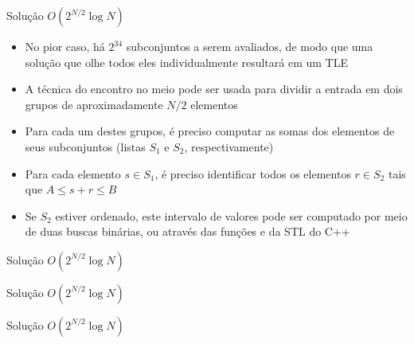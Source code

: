 \begin{frame}[fragile]{Solução $O(2^{N/2}\log N)$}

    \begin{itemize}
        \item No pior caso, há $2^{34}$ subconjuntos a serem avaliados, de modo que uma solução
            que olhe todos eles individualmente resultará em um TLE

        \item A técnica do encontro no meio pode ser usada para dividir a entrada em dois
            grupos de aproximadamente $N/2$ elementos

        \item Para cada um destes grupos, é preciso computar as somas dos elementos de seus
            subconjuntos (listas $S_1$ e $S_2$, respectivamente)

        \item Para cada elemento $s\in S_1$, é preciso identificar todos os elementos $r\in S_2$
            tais que $A\leq s + r\leq B$

        \item Se $S_2$ estiver ordenado, este intervalo de valores pode ser computado por meio
            de duas buscas binárias, ou através das funções  e
             da STL do C++

    \end{itemize}

\end{frame}

\begin{frame}[fragile]{Solução $O(2^{N/2}\log N)$}
\end{frame}

\begin{frame}[fragile]{Solução $O(2^{N/2}\log N)$}
\end{frame}

\begin{frame}[fragile]{Solução $O(2^{N/2}\log N)$}
\end{frame}

